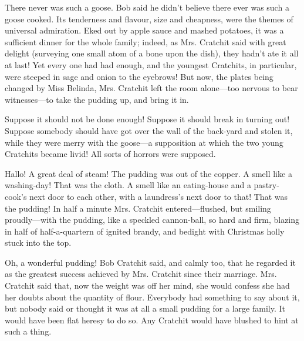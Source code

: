 \documentclass[paper=a5,BCOR=15mm,twoside,DIV=15,headinclude=off,12pt,chapterprefix=off,openany,headings=huge]{scrbook} %
\begin{document}
There never was such a goose. Bob said he didn't believe there ever was such a goose cooked. Its tenderness and flavour, size and cheapness, were the themes of universal admiration. Eked out by apple sauce and mashed potatoes, it was a sufficient dinner for the whole family; indeed, as Mrs. Cratchit said with great delight (surveying one small atom of a bone upon the dish), they hadn't ate it all at last! Yet every one had had enough, and the youngest Cratchits, in particular, were steeped in sage and onion to the eyebrows! But now, the plates being changed by Miss Belinda, Mrs. Cratchit left the room alone—too nervous to bear witnesses—to take the pudding up, and bring it in.

Suppose it should not be done enough! Suppose it should break in turning out! Suppose somebody should have got over the wall of the back-yard and stolen it, while they were merry with the goose—a supposition at which the two young Cratchits became livid! All sorts of horrors were supposed.

Hallo! A great deal of steam! The pudding was out of the copper. A smell like a washing-day! That was the cloth. A smell like an eating-house and a pastry-cook's next door to each other, with a laundress's next door to that! That was the pudding! In half a minute Mrs. Cratchit entered—flushed, but smiling proudly—with the pudding, like a speckled cannon-ball, so hard and firm, blazing in half of half-a-quartern of ignited brandy, and bedight with Christmas holly stuck into the top.

Oh, a wonderful pudding! Bob Cratchit said, and calmly too, that he regarded it as the greatest success achieved by Mrs. Cratchit since their marriage. Mrs. Cratchit said that, now the weight was off her mind, she would confess she had her doubts about the quantity of flour. Everybody had something to say about it, but nobody said or thought it was at all a small pudding for a large family. It would have been flat heresy to do so. Any Cratchit would have blushed to hint at such a thing.
\end{document}
